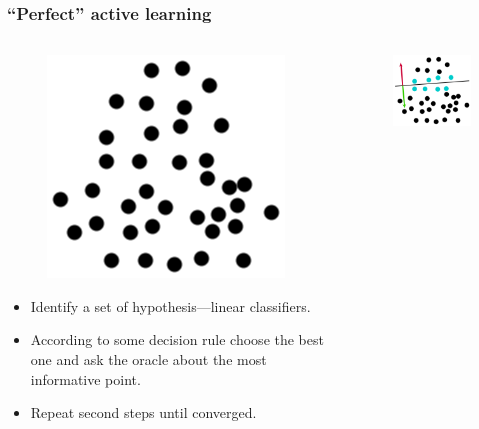 \documentclass{beamer}
\begin{document}
  \begin{frame}
    \frametitle{``Perfect'' active learning}
    \begin{columns}
      \begin{column}{5.5cm}
        \begin{figure}
          \includegraphics[scale=.25]{graphics/presentation/clusters2} 
        \end{figure}
        \begin{itemize}
          \item Identify a set of hypothesis---linear classifiers.
          \item According to some decision rule choose the best one and ask the oracle about the most informative point.
          \item Repeat second steps until converged.
        \end{itemize}
      \end{column}
      \begin{column}{4.5cm}
        \begin{figure}
          \includegraphics[scale=.5]{graphics/presentation/al1e} 
        \end{figure}
      \end{column}
    \end{columns}
  \end{frame}
\end{document}

